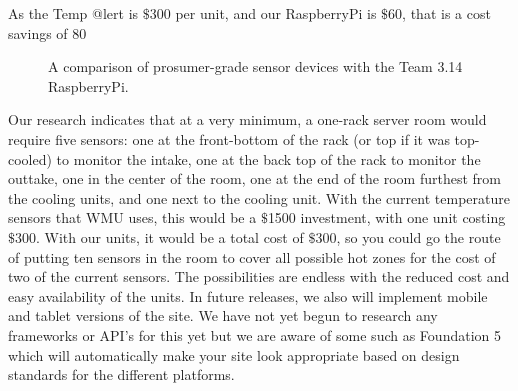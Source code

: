 \documentclass{report}
\begin{document}
\newline
  As the Temp @lert is $\$$300 per unit, and our RaspberryPi is $\$$60, that is a cost savings of 80%
\begin{figure}[H]
\caption{A comparison of prosumer-grade sensor devices with the Team 3.14 RaspberryPi.}
\end{figure}

  Our research indicates that at a very minimum, a one-rack server room would require five sensors: one at the front-bottom of the rack (or top if it was top-cooled) to monitor the intake, one at the back top of the rack to monitor the outtake, one in the center of the room, one at the end of the room furthest from the cooling units, and one next to the cooling unit. With the current temperature sensors that WMU uses, this would be a $\$$1500 investment, with one unit costing $\$$300.  With our units, it would be a total cost of $\$$300, so you could go the route of putting ten sensors in the room to cover all possible hot zones for the cost of two of the current sensors. The possibilities are endless with the reduced cost and easy availability of the units. 
\newline
  In future releases, we also will implement mobile and tablet versions of the site.  We have not yet begun to research any frameworks or API's for this yet but we are aware of some such as Foundation 5 which will automatically make your site look appropriate based on design standards for the different platforms. 
\newpage
\end{document}
